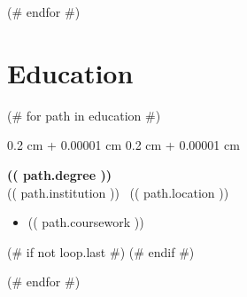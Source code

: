 \documentclass[10pt, letterpaper]{article}
\newenvironment{highlights}{
    \begin{itemize}[
        topsep=0.10 cm,
        parsep=0.10 cm,
        partopsep=0pt,
        itemsep=0pt,
        leftmargin=0.4 cm + 10pt
    ]
}{
    \end{itemize}
} %
\newenvironment{onecolentry}{
    \begin{adjustwidth}{
        0.2 cm + 0.00001 cm
    }{
        0.2 cm + 0.00001 cm
    }
}{
    \end{adjustwidth}
} %
\begin{document}
        (# endfor #)

        \vspace{0.2 cm}

    \section{Education}

        (# for path in education #)

            \begin{onecolentry}
                \textbf{(( path.degree ))} \\
                (( path.institution )) \textbar\ (( path.location )) 
                \begin{highlights}
                    \item (( path.coursework ))
                \end{highlights}
            \end{onecolentry}
        
        (# if not loop.last #)
            \vspace{0.2 cm}
        (# endif #)

        (# endfor #)
\end{document}
